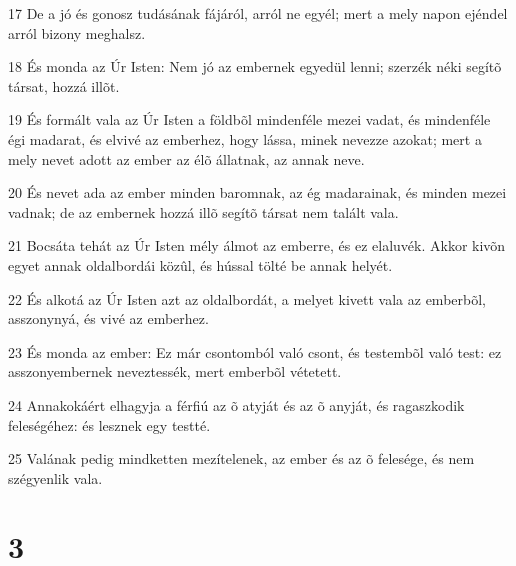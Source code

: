 \par 17 De a jó és gonosz tudásának fájáról, arról ne egyél; mert a mely napon ejéndel arról bizony meghalsz.
\par 18 És monda az Úr Isten: Nem jó az embernek egyedül lenni; szerzék néki segítõ társat, hozzá illõt.
\par 19 És formált vala az Úr Isten a földbõl mindenféle mezei vadat, és mindenféle égi madarat, és elvivé az emberhez, hogy lássa, minek nevezze azokat; mert a mely nevet adott az ember az élõ állatnak, az annak neve.
\par 20 És nevet ada az ember minden baromnak, az ég madarainak, és minden mezei vadnak; de az embernek hozzá illõ segítõ társat nem talált vala.
\par 21 Bocsáta tehát az Úr Isten mély álmot az emberre, és ez elaluvék. Akkor kivõn egyet annak oldalbordái közûl, és hússal tölté be annak helyét.
\par 22 És alkotá az Úr Isten azt az oldalbordát, a melyet kivett vala az emberbõl, asszonynyá, és vivé az emberhez.
\par 23 És monda az ember: Ez már csontomból való csont, és testembõl való test: ez asszonyembernek neveztessék, mert emberbõl vétetett.
\par 24 Annakokáért elhagyja a férfiú az õ atyját és az õ anyját, és ragaszkodik feleségéhez: és lesznek egy testté.
\par 25 Valának pedig mindketten mezítelenek, az ember és az õ felesége, és nem szégyenlik vala.

\chapter{3}

